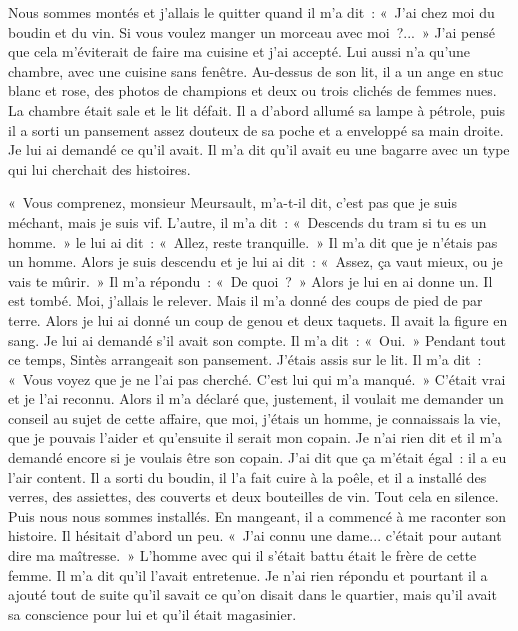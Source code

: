 \documentclass[french,twoside]{book} %
\begin{document}
Nous sommes montés et j’allais le quitter quand il m’a dit : « J'ai chez moi du boudin et du vin. Si vous voulez manger un morceau avec moi ?... » J'ai pensé que cela m’éviterait de faire ma cuisine et j’ai accepté. Lui aussi n’a qu’une chambre, avec une cuisine sans fenêtre. Au-dessus de son lit, il a un ange en stuc blanc et rose, des photos de champions et deux ou trois clichés de femmes nues. La chambre était sale et le lit défait. Il a d’abord allumé sa lampe à pétrole, puis il a sorti un pansement assez douteux de sa poche et a enveloppé sa main droite. Je lui ai demandé ce qu’il avait. Il m’a dit qu’il avait eu une bagarre avec un type qui lui cherchait des histoires.\par
« Vous comprenez, monsieur Meursault, m’a-t-il dit, c’est pas que je suis méchant, mais je suis vif. L'autre, il m’a dit : « Descends du tram si tu es un homme. » le lui ai dit : « Allez, reste tranquille. » Il m’a dit que je n’étais pas un homme. Alors je suis descendu et je lui ai dit : « Assez, ça vaut mieux, ou je vais te mûrir. » Il m’a répondu : « De quoi ? » Alors je lui en ai donne un. Il est tombé. Moi, j’allais le relever. Mais il m’a donné des coups de pied de par terre. Alors je lui ai donné un coup de genou et deux taquets. Il avait la figure en sang. Je lui ai demandé s’il avait son compte. Il m’a dit : « Oui. » Pendant tout ce temps, Sintès arrangeait son pansement. J'étais assis sur le lit. Il m’a dit : « Vous voyez que je ne l’ai pas cherché. C'est lui qui m’a manqué. » C'était vrai et je l’ai reconnu. Alors il m’a déclaré que, justement, il voulait me demander un conseil au sujet de cette affaire, que moi, j’étais un homme, je connaissais la vie, que je pouvais l’aider et qu’ensuite il serait mon copain. Je n’ai rien dit et il m’a demandé encore si je voulais être son copain. J'ai dit que ça m’était égal : il a eu l’air content. Il a sorti du boudin, il l’a fait cuire à la poêle, et il a installé des verres, des assiettes, des couverts et deux bouteilles de vin. Tout cela en silence. Puis nous nous sommes installés. En mangeant, il a commencé à me raconter son histoire. Il hésitait d’abord un peu. « J'ai connu une dame... c’était pour autant dire ma maîtresse. » L'homme avec qui il s’était battu était le frère de cette femme. Il m’a dit qu’il l’avait entretenue. Je n’ai rien répondu et pourtant il a ajouté tout de suite qu’il savait ce qu’on disait dans le quartier, mais qu’il avait sa conscience pour lui et qu’il était magasinier.\par
\end{document}
